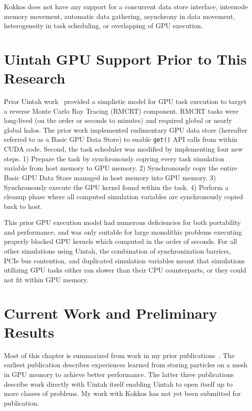 \documentclass[12pt]{article}
\begin{document}
  
Kokkos does not have any support for a concurrent data store interface, internode memory movement, automatic data gathering, asynchrony in data movement, heterogeneity in task scheduling, or overlapping of GPU execution.



\section{Uintah GPU Support Prior to This Research}
\label{ch:uintah_prior}

Prior Uintah work~\cite{wolfhpc12} provided a simplistic model for GPU task execution to target a reverse Monte Carlo Ray Tracing (RMCRT) component.  RMCRT tasks were long-lived (on the order or seconds to minutes) and required global or nearly global halos.  The prior work implemented rudimentary GPU data store (hereafter referred to as a Basic GPU Data Store) to enable \texttt{get()} API calls from within CUDA code.  Second, the task scheduler was modified by implementing four new steps.  1) Prepare the task by synchronously copying every task simulation variable from host memory to GPU memory. 2) Synchronously copy the entire Basic GPU Data Store managed in host memory into GPU memory.  3) Synchronously execute the GPU kernel found within the task.  4) Perform a cleanup phase where all computed simulation variables are synchronously copied back to host.  
	
This prior GPU execution model had numerous deficiencies for both portability and performance, and was only suitable for large monolithic problems executing properly blocked GPU kernels which computed in the order of seconds.  For all other simulations using Uintah, the combination of synchronization barriers, PCIe bus contention, and duplicated simulation variables meant that simulations utilizing GPU tasks either ran slower than their CPU counterparts, or they could not fit within GPU memory.  

\section{Current Work and Preliminary Results}
\label{ch:uintah_current}

Most of this chapter is summarized from work in my prior publications~\cite{saahpc-2010-brad, wolfhpc15,ijpp16, espm2-brad}.  The earliest publication describes experiences learned from storing particles on a mesh in GPU memory to achieve better performance.  The latter three publications describe work directly with Uintah itself enabling Uintah to open itself up to more classes of problems.  My work with Kokkos has not yet been submitted for publication.  
\end{document}
